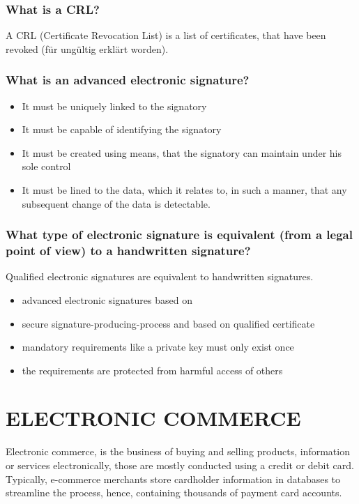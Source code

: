 \documentclass[a4paper, 10 pt, conference]{ieeeconf}
\begin{document}
\subsubsection{\textbf{What is a CRL?}} 
A CRL (Certificate Revocation List) is a list of certificates, that have been revoked (für ungültig erklärt worden). 

\pagebreak
\subsubsection{\textbf{What is an advanced electronic signature?}} 
\begin{itemize}
\item It must be uniquely linked to the signatory
\item It must be capable of identifying the signatory
\item It must be created using means, that the signatory can maintain under his sole control
\item It must be lined to the data, which it relates to, in such a manner, that any subsequent change of the data is detectable. 
\end{itemize}
\subsubsection{\textbf{What type of electronic signature is equivalent (from a legal point of view) to a handwritten signature?}} 
Qualified electronic signatures are equivalent to handwritten signatures.
\begin{itemize}
\item advanced electronic signatures based on
\item secure signature-producing-process and based on qualified certificate
\item mandatory requirements like a private key must only exist once
\item the requirements are protected from harmful access of others
\end{itemize}

\raggedbottom

\pagebreak
\section{\textbf{ELECTRONIC COMMERCE}}
Electronic commerce, is the business of buying and selling products, information or services electronically, those are mostly conducted using a credit or debit card. 
Typically, e-commerce merchants store cardholder information in databases to streamline the process, hence, containing thousands of payment card accounts. 
\end{document}
